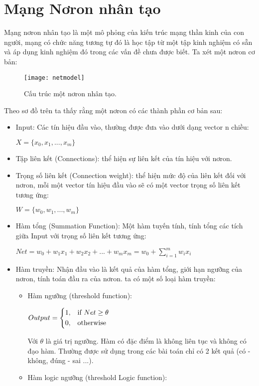 \documentclass[13pt, a4paper]{extreport}
\begin{document}
\section{Mạng Nơron nhân tạo}
Mạng nơron nhân tạo là một mô phỏng của kiến trúc mạng thần kinh của con người, mạng có chức năng tương tự đó là học tập từ một tập kinh nghiệm có sẵn và áp dụng kinh nghiệm đó trong các vấn đề chưa được biết. Ta xét một nơron cơ bản:
  \begin{figure}[H]
  	\centering
    \texttt{[image: netmodel]}
    \caption{\large Cấu trúc một nơron nhân tạo.}
  \end{figure}
Theo sơ đồ trên ta thấy rằng một nơron có các thành phần cơ bản sau:
\begin{itemize}
\item Input: Các tín hiệu đầu vào, thường được đưa vào dưới dạng vector n chiều:\\
	\centerline {$X = \{x_0, x_1, ..., x_m\}$}
\item Tập liên kết (Connections): thể hiện sự liên kết của tín hiệu với nơron.
\item Trọng số liên kết (Connection weight): thể hiện mức độ của liên kết đối với nơron, mỗi một vector tín hiệu đầu vào sẽ có một vector trọng số liên kết tương ứng:\\
	\centerline {$W = \{w_0, w_1, ..., w_m\}$}
\item Hàm tổng (Summation Function): Một hàm tuyến tính, tính tổng các tích giữa Input với trọng số liên kết tương ứng:\\
	\centerline {$Net = w_0 + w_1x_1 + w_2x_2 + ... + w_mx_m = w_0 + \sum\limits_{i=1}^m w_ix_i$}
\item Hàm truyền: Nhận đầu vào là kết quả của hàm tổng, giới hạn ngưỡng của nơron, tính toán đầu ra của nơron. ta có một số loại hàm truyền:
	\begin{itemize}
		\item Hàm ngưỡng (threshold function):
		  \begin{center}
			$Output = \begin{dcases} 1, & \text{if } Net \geq \theta\\ 0, & \text{otherwise} \end{dcases}$
		  \end{center}	
		Với $\theta$ là giá trị ngưỡng. Hàm có đặc điểm là không liên tục và không có đạo hàm. Thường được sử dụng trong các bài toán chỉ có 2 kết quả (có - không, đúng - sai ...).
		\item Hàm logic ngưỡng (threshold Logic function):

\end{itemize}
\end{itemize}
\end{document}
